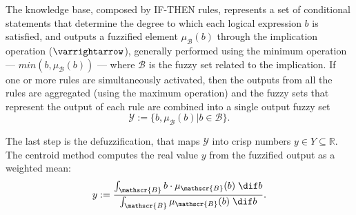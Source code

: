 The  knowledge base, composed by IF-THEN rules, represents a set of conditional statements that determine the degree to which each logical expression $b$ is satisfied, and outputs a fuzzified element $\mu_{\mathscr{B}}(b)$ through the implication operation  ($\varrightarrow$), generally performed using the minimum operation --- $min(b, \mu_{\mathscr{B}}(b))$ --- where $\mathscr{B}$ is the fuzzy set related to the implication. If one or more rules are simultaneously activated, then the outputs from all the rules are aggregated (using the maximum operation) and the fuzzy sets that represent the output of each rule are combined into a single output fuzzy set
\begin{equation}
    \mathscr{Y} := \{b, \mu_{\mathscr{B}}(b) | b \in \mathscr{B} \}.
\end{equation}

%
The last step is the defuzzification, that maps $\mathscr{Y}$ into crisp numbers $y \in {Y} \subseteq \mathbb{R}$. The centroid method computes the real value $y$ from the fuzzified output as a weighted mean:
\begin{equation}
    y := \frac{\int_{\mathscr{B}} b \cdot \mu_{\mathscr{B}}(b) \; \dif b}  {\int_{\mathscr{B}} \mu_{\mathscr{B}}(b) \; \dif b}.
\end{equation}


